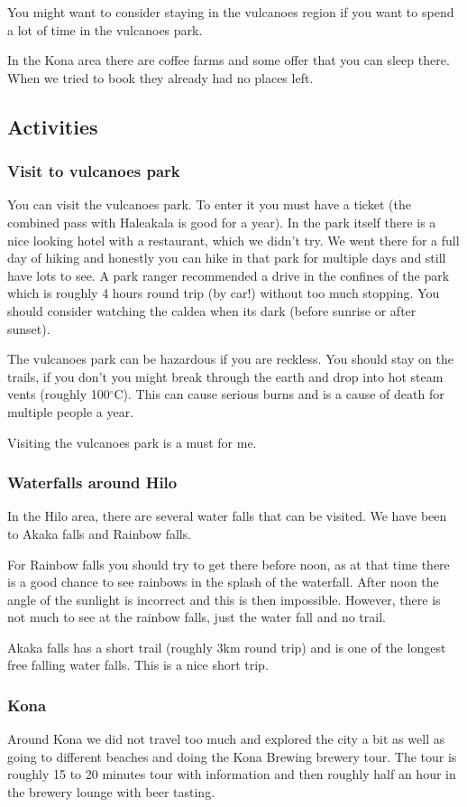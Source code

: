 \documentclass[11pt,a4paper,sans,english]{article}
\begin{document}
You might want to consider staying in the vulcanoes region if you want to spend a lot of time in the vulcanoes park.

In the Kona area there are coffee farms and some offer that you can sleep there. When we tried to book they already had no places left.
\subsection{Activities}
\subsubsection{Visit to vulcanoes park}
You can visit the vulcanoes park. To enter it you must have a ticket (the combined pass with Haleakala is good for a year). In the park itself there is a nice looking hotel with a restaurant, which we didn't try. We went there for a full day of hiking and honestly you can hike in that park for multiple days and still have lots to see. A park ranger recommended a drive in the confines of the park which is roughly 4 hours round trip (by car!) without too much stopping.
You should consider watching the caldea when its dark (before sunrise or after sunset).

The vulcanoes park can be hazardous if you are reckless. You should stay on the trails, if you don't you might break through the earth and drop into hot steam vents (roughly 100$^\circ$C). This can cause serious burns and is a cause of death for multiple people a year.

Visiting the vulcanoes park is a must for me.
\subsubsection{Waterfalls around Hilo}
In the Hilo area, there are several water falls that can be visited. We have been to Akaka falls and Rainbow falls. 

For Rainbow falls you should try to get there before noon, as at that time there is a good chance to see rainbows in the splash of the waterfall. After noon the angle of the sunlight is incorrect and this is then impossible. However, there is not much to see at the rainbow falls, just the water fall and no trail.

Akaka falls has a short trail (roughly 3km round trip) and is one of the longest free falling water falls. This is a nice short trip.
\subsubsection{Kona}
Around Kona we did not travel too much and explored the city a bit as well as going to different beaches and doing the Kona Brewing brewery tour. The tour is roughly 15 to 20 minutes tour with information and then roughly half an hour in the brewery lounge with beer tasting. 
\end{document}

